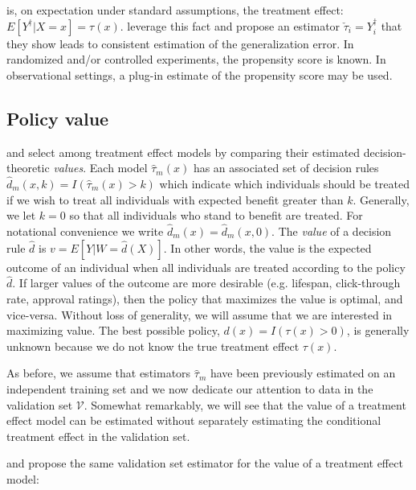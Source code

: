 is, on expectation under standard assumptions, the treatment effect: $E[Y^{\dagger}|X=x] = \tau(x)$. \citet{Gutierrez:2016tq} leverage this fact and propose an estimator $\check \tau_i = Y^{\dagger}_i$ that they show leads to consistent estimation of the generalization error. In randomized and/or controlled experiments, the propensity score is known. In observational settings, a plug-in estimate of the propensity score may be used.


\subsection{Policy value}

\citet{Kapelner:3baXYEjR} and \cite{Zhao:2017wa} select among treatment effect models by comparing their estimated decision-theoretic \emph{values}. Each model $\hat\tau_m(x)$ has an associated set of decision rules $\hat d_{m}(x,k) = I(\hat\tau_m(x) > k)$ which indicate which individuals should be treated if we wish to treat all individuals with expected benefit greater than $k$. Generally, we let $k=0$ so that all individuals who stand to benefit are treated. For notational convenience we write $\hat d_m(x) = \hat d_{m}(x,0)$. The \emph{value} of a decision rule $\hat d$ is $v = E[Y|W=\hat d(X)]$. In other words, the value is the expected outcome of an individual when all individuals are treated according to the policy $\hat d$. If larger values of the outcome are more desirable (e.g. lifespan, click-through rate, approval ratings), then the policy that maximizes the value is optimal, and vice-versa. Without loss of generality, we will assume that we are interested in maximizing value. The best possible policy, $d(x) = I(\tau(x) > 0)$, is generally unknown because we do not know the true treatment effect $\tau(x)$. 

As before, we assume that estimators $\hat\tau_m$ have been previously estimated on an independent training set and we now dedicate our attention to data in the validation set $\mathcal{V}$. Somewhat remarkably, we will see that the value of a treatment effect model can be estimated without separately estimating the conditional treatment effect in the validation set.

\citet{Kapelner:3baXYEjR} and \cite{Zhao:2017wa} propose the same validation set estimator for the value of a treatment effect model:

